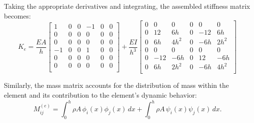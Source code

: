 \documentclass{article}
\begin{document}
	
	Taking the appropriate derivatives and integrating, the assembled stiffness matrix becomes:
	\begin{equation}
		K_e = 
		\frac{EA}{h}
		\begin{bmatrix}
			1 & 0 & 0 & -1 & 0 & 0 \\
			0 & 0 & 0 & 0 & 0 & 0 \\
			0 & 0 & 0 & 0 & 0 & 0 \\
			-1 & 0 & 0 & 1 & 0 & 0 \\
			0 & 0 & 0 & 0 & 0 & 0 \\
			0 & 0 & 0 & 0 & 0 & 0 \\
		\end{bmatrix}
		+
		\frac{EI}{h^3}
		\begin{bmatrix}
			0 & 0 & 0 & 0 & 0 & 0 \\
			0 & 12 & 6h & 0 & -12 & 6h \\
			0 & 6h & 4h^2 & 0 & -6h & 2h^2 \\
			0 & 0 & 0 & 0 & 0 & 0 \\
			0 & -12 & -6h & 0 & 12 & -6h \\
			0 & 6h & 2h^2 & 0 & -6h & 4h^2 \\
		\end{bmatrix}
	\end{equation}
	
	Similarly, the mass matrix accounts for the distribution of mass within the element and its contribution to the element’s dynamic behavior:
	\begin{equation}
		M_{ij}^{(e)} = \int_0^h \rho A\, \phi_i(x) \phi_j(x)\, dx + \int_0^h \rho A\, \psi_i(x) \psi_j(x)\, dx.
	\end{equation}
	
\end{document}

